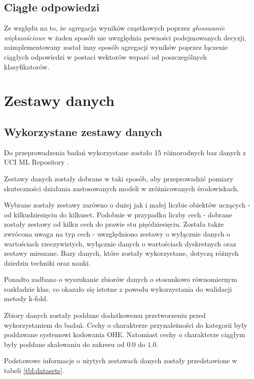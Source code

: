 \documentclass[11pt, a4paper, titlepage]{report}
\begin{document}
\subsection{Ciągłe odpowiedzi}
Ze względu na to, że agregacja wyników cząstkowych poprzez \textit{głosowanie większościowe} w żaden sposób nie uwzględnia pewności podejmowanych decyzji, zaimplementowany został inny sposób agregacji wyników poprzez łączenie ciągłych odpowiedzi w postaci wektorów wsparć od poszczególnych klasyfikatorów.

\section{Zestawy danych}
\subsection{Wykorzystane zestawy danych}

Do przeprowadzenia badań wykorzystane zostało 15 różnorodnych baz danych z UCI ML Repository \cite{UCI_ML_Repo}.	

Zestawy danych zostały dobrane w taki sposób, aby przeprowadzić pomiary skuteczności działania zastosowanych modeli w zróżnicowanych środowiskach.

Wybrane zostały zestawy zarówno o dużej jak i małej liczbie obiektów uczących - od kilkudziesięciu do kilkuset. Podobnie w przypadku liczby cech - dobrane zostały zestawy od kilku cech do prawie stu pięćdziesięciu. Została także zwrócona uwaga na typ cech - uwzględniono zestawy o wyłącznie danych o wartościach rzeczywistych, wyłącznie danych o wartościach dyskretnych oraz zestawy mieszane. Bazy danych, które zostały wykorzystane, dotyczą różnych dziedzin techniki oraz nauki.

Ponadto zadbano o wyszukanie zbiorów danych o stosunkowo równomiernym rozkładzie klas, co okazało się istotne z powodu wykorzystania do walidacji metody k-fold.

Zbiory danych zostały poddane dodatkowemu przetworzeniu przed wykorzystaniem do badań. Cechy o charakterze przynależności do kategorii były poddawane systemowi kodowania OHE. Natomiast cechy o charakterze ciągłym były poddane skalowaniu do zakresu od $0.0$ do $1.0$.

Podstawowe informacje o użytych zestawach danych zostały przedstawione w tabeli \ref{tbl:datasets}.

\begin{center}

\end{center}
\end{document}
